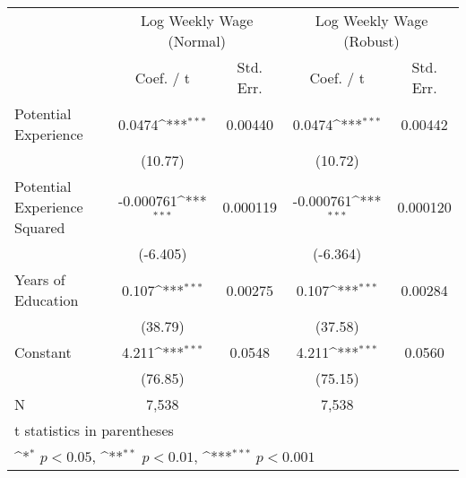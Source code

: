 {
\def\sym#1{\ifmmode^{#1}\else\(^{#1}\)\fi}
\begin{tabular}{l*{2}{cc}}
\hline\hline
          &\multicolumn{2}{c}{Log Weekly Wage (Normal)}&\multicolumn{2}{c}{Log Weekly Wage (Robust)}\\
          &Coef. / t         &Std. Err.&Coef. / t         &Std. Err.\\
\hline
Potential Experience&   0.0474\sym{***}&  0.00440&   0.0474\sym{***}&  0.00442\\
          &  (10.77)         &         &  (10.72)         &         \\
Potential Experience Squared&-0.000761\sym{***}& 0.000119&-0.000761\sym{***}& 0.000120\\
          & (-6.405)         &         & (-6.364)         &         \\
Years of Education&    0.107\sym{***}&  0.00275&    0.107\sym{***}&  0.00284\\
          &  (38.79)         &         &  (37.58)         &         \\
Constant  &    4.211\sym{***}&   0.0548&    4.211\sym{***}&   0.0560\\
          &  (76.85)         &         &  (75.15)         &         \\
\hline
N         &    7,538         &         &    7,538         &         \\
\hline\hline
\multicolumn{5}{l}{\footnotesize t statistics in parentheses}\\
\multicolumn{5}{l}{\footnotesize \sym{*} \(p<0.05\), \sym{**} \(p<0.01\), \sym{***} \(p<0.001\)}\\
\end{tabular}
}
